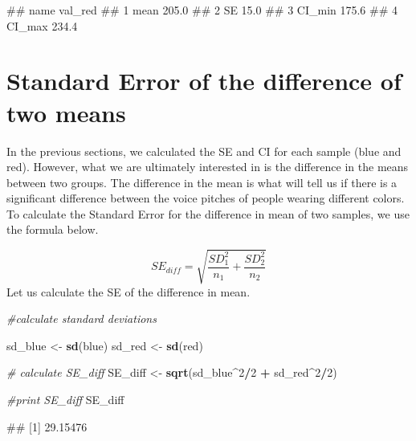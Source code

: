 \documentclass[
]{book}
\newenvironment{Shaded}{\begin{snugshade}}{\end{snugshade}}
\newcommand{\CommentTok}[1]{\textcolor[rgb]{0.56,0.35,0.01}{\textit{#1}}}
\newcommand{\DecValTok}[1]{\textcolor[rgb]{0.00,0.00,0.81}{#1}}
\newcommand{\FunctionTok}[1]{\textcolor[rgb]{0.13,0.29,0.53}{\textbf{#1}}}
\newcommand{\NormalTok}[1]{#1}
\newcommand{\OtherTok}[1]{\textcolor[rgb]{0.56,0.35,0.01}{#1}}
\newcommand{\SpecialCharTok}[1]{\textcolor[rgb]{0.81,0.36,0.00}{\textbf{#1}}}
\begin{document}
\begin{Shaded}
\begin{Highlighting}[]
\NormalTok{\#\#     name val\_red}
\NormalTok{\#\# 1   mean   205.0}
\NormalTok{\#\# 2     SE    15.0}
\NormalTok{\#\# 3 CI\_min   175.6}
\NormalTok{\#\# 4 CI\_max   234.4}
\end{Highlighting}
\end{Shaded}

\hypertarget{standard-error-of-the-difference-of-two-means}{%
\section{Standard Error of the difference of two means}\label{standard-error-of-the-difference-of-two-means}}

In the previous sections, we calculated the SE and CI for each sample (blue and red). However, what we are ultimately interested in is the difference in the means between two groups. The difference in the mean is what will tell us if there is a significant difference between the voice pitches of people wearing different colors. To calculate the Standard Error for the difference in mean of two samples, we use the formula below.

\[SE_{diff} = \sqrt{\frac{SD_1^2}{n_1}+\frac{SD_2^2}{n_2}}\]
Let us calculate the SE of the difference in mean.

\begin{Shaded}
\begin{Highlighting}[]
\CommentTok{\#calculate standard deviations}

\NormalTok{sd\_blue }\OtherTok{\textless{}{-}} \FunctionTok{sd}\NormalTok{(blue)}
\NormalTok{sd\_red }\OtherTok{\textless{}{-}} \FunctionTok{sd}\NormalTok{(red)}

\CommentTok{\# calculate SE\_diff}
\NormalTok{SE\_diff }\OtherTok{\textless{}{-}} \FunctionTok{sqrt}\NormalTok{(sd\_blue}\SpecialCharTok{\^{}}\DecValTok{2}\SpecialCharTok{/}\DecValTok{2} \SpecialCharTok{+}\NormalTok{ sd\_red}\SpecialCharTok{\^{}}\DecValTok{2}\SpecialCharTok{/}\DecValTok{2}\NormalTok{)}

\CommentTok{\#print SE\_diff}
\NormalTok{SE\_diff}
\end{Highlighting}
\end{Shaded}

\begin{Shaded}
\begin{Highlighting}[]
\NormalTok{\#\# [1] 29.15476}
\end{Highlighting}
\end{Shaded}
\end{document}
